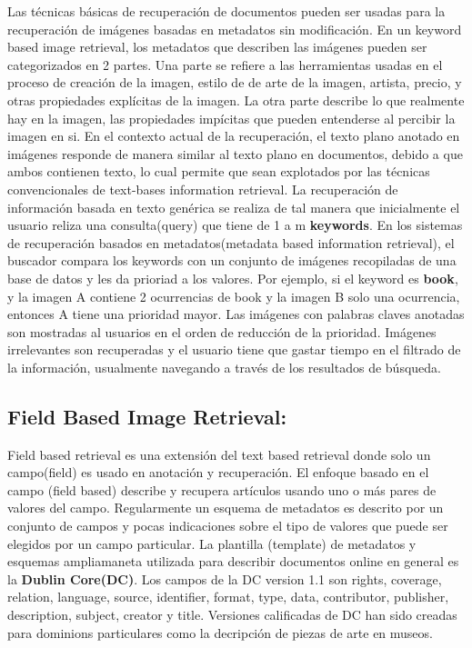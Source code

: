 \documentclass{llncs}
\begin{document}
Las t\'ecnicas b\'asicas de recuperaci\'on de documentos pueden ser usadas para la recuperaci\'on
de im\'agenes basadas en metadatos sin modificaci\'on. En un keyword based image
retrieval, los metadatos que describen las im\'agenes pueden ser categorizados en 2
partes. Una parte se refiere a las herramientas usadas en el proceso de creaci\'on de la imagen, estilo de
de arte de la imagen, artista, precio, y otras propiedades expl\'icitas de la imagen. La otra parte describe
lo que realmente hay en la imagen, las propiedades imp\'icitas que pueden entenderse al 
percibir la imagen en si. En el contexto actual de la recuperaci\'on, el texto plano anotado en im\'agenes
responde de manera similar al texto plano en documentos, debido a que ambos contienen texto, lo cual permite
que sean explotados por las t\'ecnicas convencionales de text-bases information retrieval. La recuperaci\'on de
informaci\'on basada en texto gen\'erica se realiza de tal manera que inicialmente el usuario reliza una
consulta(query) que tiene de 1 a m \textbf{keywords}. En los sistemas de recuperaci\'on basados en 
metadatos(metadata based information retrieval), el buscador compara los keywords con un conjunto de im\'agenes 
recopiladas de una base de datos y les da prioriad a los valores. Por ejemplo, si el keyword es \textbf{book}, y la 
imagen A contiene 2 ocurrencias de book y la imagen B solo una ocurrencia, entonces A tiene una prioridad mayor.  Las 
im\'agenes con palabras claves anotadas son mostradas al usuarios en el orden de reducci\'on de la prioridad. Im\'agenes 
irrelevantes son recuperadas y el usuario tiene que gastar tiempo en el filtrado de la informaci\'on, usualmente navegando
a trav\'es de los resultados de b\'usqueda. 

\subsection{Field Based Image Retrieval:}
Field based retrieval es una extensi\'on del text based retrieval donde solo un campo(field) es usado en anotaci\'on 
y recuperaci\'on. El enfoque basado en el campo (field based) describe y recupera art\'iculos usando uno o m\'as pares de valores 
del campo. Regularmente un esquema de metadatos es descrito por un conjunto de campos y pocas indicaciones sobre el tipo de
valores que puede ser elegidos por un campo  particular. La plantilla (template) de metadatos y esquemas ampliamaneta utilizada para 
describir documentos online en general es la \textbf{Dublin Core(DC)}. Los campos de la DC version 1.1 son rights, coverage, relation,
language, source, identifier, format, type, data, contributor, publisher, description, subject, creator y title.  Versiones calificadas de 
DC han sido creadas para dominions particulares como la decripci\'on de piezas de arte en museos.
\end{document}
